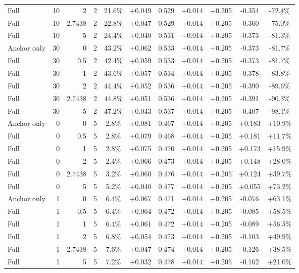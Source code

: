 \begin{table}[htbp]
\begin{tabular}{lrrrccccccc}
Full & 10 & 2 & 2 & 21.6\% & +0.049 & 0.529 & +0.014 & +0.205 & -0.354 & -72.4\% \\
Full & 10 & 2.7438 & 2 & 22.8\% & +0.047 & 0.529 & +0.014 & +0.205 & -0.360 & -75.0\% \\
Full & 10 & 5 & 2 & 24.4\% & +0.040 & 0.531 & +0.014 & +0.205 & -0.373 & -81.3\% \\
Anchor only & 30 & 0 & 2 & 43.2\% & +0.062 & 0.533 & +0.014 & +0.205 & -0.373 & -81.7\% \\
Full & 30 & 0.5 & 2 & 42.4\% & +0.059 & 0.533 & +0.014 & +0.205 & -0.373 & -81.7\% \\
Full & 30 & 1 & 2 & 43.6\% & +0.057 & 0.534 & +0.014 & +0.205 & -0.378 & -83.8\% \\
Full & 30 & 2 & 2 & 44.4\% & +0.052 & 0.536 & +0.014 & +0.205 & -0.390 & -89.6\% \\
Full & 30 & 2.7438 & 2 & 44.8\% & +0.051 & 0.536 & +0.014 & +0.205 & -0.391 & -90.3\% \\
Full & 30 & 5 & 2 & 47.2\% & +0.043 & 0.537 & +0.014 & +0.205 & -0.407 & -98.1\% \\
Anchor only & 0 & 0 & 5 & 2.8\% & +0.081 & 0.467 & +0.014 & +0.205 & +0.183 & +10.9\% \\
Full & 0 & 0.5 & 5 & 2.8\% & +0.079 & 0.468 & +0.014 & +0.205 & +0.181 & +11.7\% \\
Full & 0 & 1 & 5 & 2.8\% & +0.075 & 0.470 & +0.014 & +0.205 & +0.173 & +15.9\% \\
Full & 0 & 2 & 5 & 2.4\% & +0.066 & 0.473 & +0.014 & +0.205 & +0.148 & +28.0\% \\
Full & 0 & 2.7438 & 5 & 3.2\% & +0.060 & 0.476 & +0.014 & +0.205 & +0.124 & +39.7\% \\
Full & 0 & 5 & 5 & 5.2\% & +0.040 & 0.477 & +0.014 & +0.205 & +0.055 & +73.2\% \\
Anchor only & 1 & 0 & 5 & 6.4\% & +0.067 & 0.471 & +0.014 & +0.205 & -0.076 & +63.1\% \\
Full & 1 & 0.5 & 5 & 6.4\% & +0.064 & 0.472 & +0.014 & +0.205 & -0.085 & +58.5\% \\
Full & 1 & 1 & 5 & 6.4\% & +0.061 & 0.472 & +0.014 & +0.205 & -0.089 & +56.5\% \\
Full & 1 & 2 & 5 & 6.8\% & +0.054 & 0.473 & +0.014 & +0.205 & -0.103 & +49.9\% \\
Full & 1 & 2.7438 & 5 & 7.6\% & +0.047 & 0.474 & +0.014 & +0.205 & -0.126 & +38.5\% \\
Full & 1 & 5 & 5 & 7.2\% & +0.032 & 0.478 & +0.014 & +0.205 & -0.162 & +21.0\% \\

\end{tabular}
\end{table}
